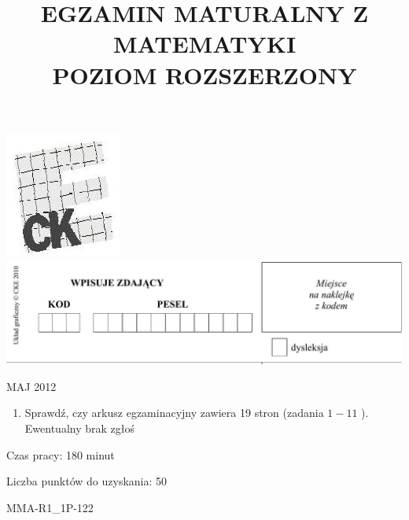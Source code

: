\documentclass[10pt]{article}
\title{EGZAMIN MATURALNY Z MATEMATYKI \\
 POZIOM ROZSZERZONY }
\author{}
\date{}
\begin{document}
\maketitle
\includegraphics[max width=\textwidth, center]{2024_11_21_606d6e4e152fe3e9f6feg-01}\\
\includegraphics[max width=\textwidth, center]{2024_11_21_606d6e4e152fe3e9f6feg-01(1)}

MAJ 2012

\begin{enumerate}
  \item Sprawdź, czy arkusz egzaminacyjny zawiera 19 stron (zadania \(1-11\) ). Ewentualny brak zgłoś
\end{enumerate}

Czas pracy: 180 minut

Liczba punktów do uzyskania: 50

MMA-R1\_1P-122
\end{document}
